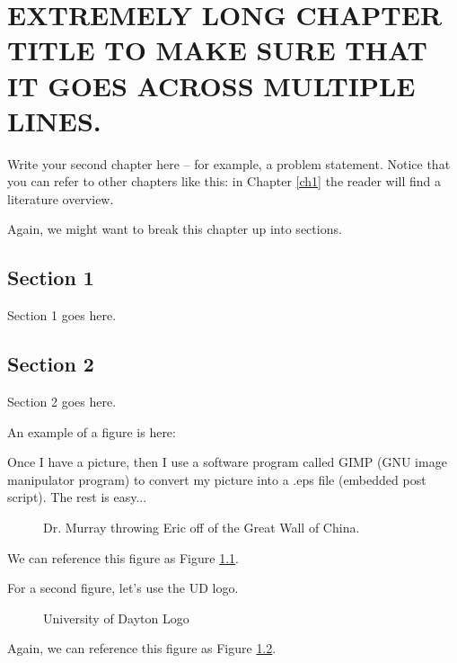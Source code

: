 \chapter{EXTREMELY LONG CHAPTER TITLE TO MAKE SURE THAT IT GOES ACROSS MULTIPLE LINES.}
\label{ch2}

Write your second chapter here -- for example, a problem
statement. Notice that you can refer to other chapters like this: in
Chapter \ref{ch1} the reader will find a literature overview.

Again, we might want to break this chapter up into sections.

\section{Section 1}

Section 1 goes here.

\section{Section 2}

Section 2 goes here.

An example of a figure is here:

Once I have a picture, then I use a software program called GIMP (GNU image manipulator program) to convert my picture into a .eps file (embedded post script).  The rest is easy...
\begin{figure}[ht]
    \centerline{\epsfysize 7cm  }
    \caption{Dr. Murray throwing Eric off of the
		Great Wall of China.}
    \label{fig:Drew_Eric}
\end{figure}
We can reference this figure as Figure \ref{fig:Drew_Eric}. 

For a second figure, let's use the UD logo.
\begin{figure}[ht]
    \centerline{\epsfysize 7cm  }
    \caption{University of Dayton Logo}
    \label{fig:UD_logo}
\end{figure}
Again, we can reference this figure as Figure \ref{fig:UD_logo}.